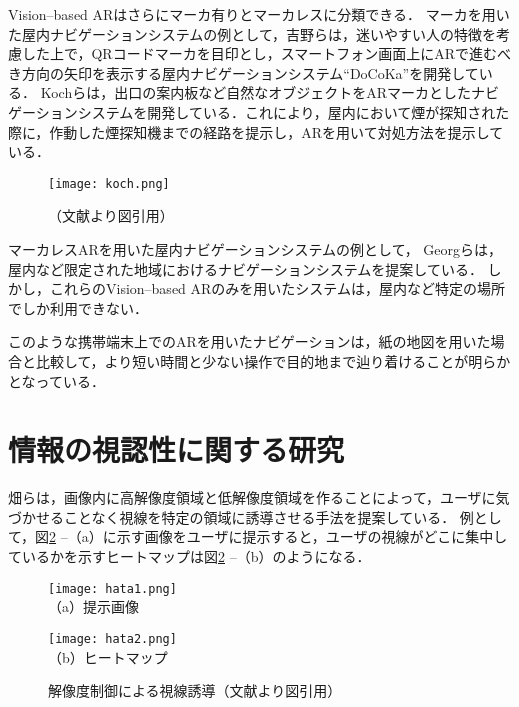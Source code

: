     Vision--based ARはさらにマーカ有りとマーカレスに分類できる．
    マーカを用いた屋内ナビゲーションシステムの例として，吉野らは，迷いやすい人の特徴を考慮した上で，QRコードマーカを目印とし，スマートフォン画面上にARで進むべき方向の矢印を表示する屋内ナビゲーションシステム``DoCoKa''を開発している\cite{Yoshino:2013}．
    Kochらは，出口の案内板など自然なオブジェクトをARマーカとしたナビゲーションシステムを開発している\cite{Koch:2014}．これにより，屋内において煙が探知された際に，作動した煙探知機までの経路を提示し，ARを用いて対処方法を提示している．
    \begin{figure}[tb]
      \centerline{\texttt{[image: koch.png]}}
      \caption{（文献\cite{Koch:2014}より図引用）}
      \label{figure:koch}
    \end{figure}

    マーカレスARを用いた屋内ナビゲーションシステムの例として，
    Georgらは，屋内など限定された地域におけるナビゲーションシステムを提案している\cite{Gerstweiler:2018, Iwanaji:2016}．
    しかし，これらのVision--based ARのみを用いたシステムは，屋内など特定の場所でしか利用できない．
    
    このような携帯端末上でのARを用いたナビゲーションは，紙の地図を用いた場合と比較して，より短い時間と少ない操作で目的地まで辿り着けることが明らかとなっている\cite{Rehman:2017, Yoshino:2013}．
    

\section{情報の視認性に関する研究}
  畑らは，画像内に高解像度領域と低解像度領域を作ることによって，ユーザに気づかせることなく視線を特定の領域に誘導させる手法を提案している\cite{Hata:2016}．
  例として，図\ref{figure:hata} --（a）に示す画像をユーザに提示すると，ユーザの視線がどこに集中しているかを示すヒートマップは図\ref{figure:hata} --（b）のようになる．
  \begin{figure}[tb]
    \begin{minipage}{0.49\hsize}
      \begin{center}
        \texttt{[image: hata1.png]}\\
        \small{（a）提示画像}
      \end{center}
    \end{minipage}
    \begin{minipage}{0.49\hsize}
      \begin{center}
        \texttt{[image: hata2.png]}\\
        \small{（b）ヒートマップ}
      \end{center}
    \end{minipage}
    \vspace{2pt}
    \caption{解像度制御による視線誘導（文献\cite{Hata:2016}より図引用）}
    \label{figure:hata}
  \end{figure}

